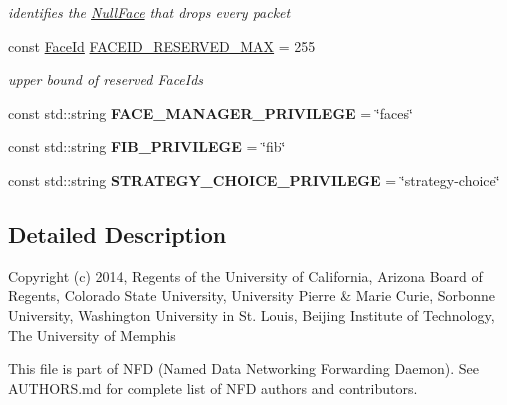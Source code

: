 \begin{DoxyCompactItemize}
\begin{DoxyCompactList}\small\item\em identifies the \hyperlink{classnfd_1_1NullFace}{Null\+Face} that drops every packet \end{DoxyCompactList}\item 
const \hyperlink{classFaceId}{Face\+Id} \hyperlink{namespacenfd_a8d43c2f665b2142c2075a74aadc27d49}{F\+A\+C\+E\+I\+D\+\_\+\+R\+E\+S\+E\+R\+V\+E\+D\+\_\+\+M\+AX} = 255\hypertarget{namespacenfd_a8d43c2f665b2142c2075a74aadc27d49}{}\label{namespacenfd_a8d43c2f665b2142c2075a74aadc27d49}

\begin{DoxyCompactList}\small\item\em upper bound of reserved Face\+Ids \end{DoxyCompactList}\item 
const std\+::string {\bfseries F\+A\+C\+E\+\_\+\+M\+A\+N\+A\+G\+E\+R\+\_\+\+P\+R\+I\+V\+I\+L\+E\+GE} = \char`\"{}faces\char`\"{}\hypertarget{namespacenfd_a66fe5fafc9fd9d513bb6a71e9db4112f}{}\label{namespacenfd_a66fe5fafc9fd9d513bb6a71e9db4112f}

\item 
const std\+::string {\bfseries F\+I\+B\+\_\+\+P\+R\+I\+V\+I\+L\+E\+GE} = \char`\"{}fib\char`\"{}\hypertarget{namespacenfd_a45379d50bbb74f3b070fadef0cf76eab}{}\label{namespacenfd_a45379d50bbb74f3b070fadef0cf76eab}

\item 
const std\+::string {\bfseries S\+T\+R\+A\+T\+E\+G\+Y\+\_\+\+C\+H\+O\+I\+C\+E\+\_\+\+P\+R\+I\+V\+I\+L\+E\+GE} = \char`\"{}strategy-\/choice\char`\"{}\hypertarget{namespacenfd_ab27fdcdcdc3809a1cf575a1e0126cc39}{}\label{namespacenfd_ab27fdcdcdc3809a1cf575a1e0126cc39}

\end{DoxyCompactItemize}


\subsection{Detailed Description}
Copyright (c) 2014, Regents of the University of California, Arizona Board of Regents, Colorado State University, University Pierre \& Marie Curie, Sorbonne University, Washington University in St. Louis, Beijing Institute of Technology, The University of Memphis

This file is part of N\+FD (Named Data Networking Forwarding Daemon). See A\+U\+T\+H\+O\+R\+S.\+md for complete list of N\+FD authors and contributors.

